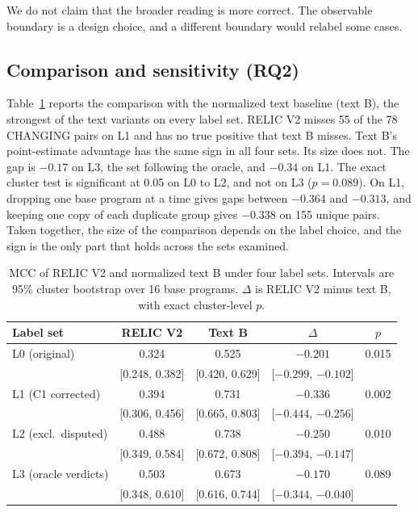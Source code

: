 \documentclass[conference]{IEEEtran}
\begin{document}
We do not claim that the broader reading is more correct. The observable boundary is a design choice, and a different boundary would relabel some cases.

\subsection{Comparison and sensitivity (RQ2)}
Table~\ref{tab:compare} reports the comparison with the normalized text baseline (text B), the strongest of the text variants on every label set. RELIC V2 misses 55 of the 78 CHANGING pairs on L1 and has no true positive that text B misses. Text B's point-estimate advantage has the same sign in all four sets. Its size does not. The gap is $-0.17$ on L3, the set following the oracle, and $-0.34$ on L1. The exact cluster test is significant at 0.05 on L0 to L2, and not on L3 ($p=0.089$). On L1, dropping one base program at a time gives gaps between $-0.364$ and $-0.313$, and keeping one copy of each duplicate group gives $-0.338$ on 155 unique pairs. Taken together, the size of the comparison depends on the label choice, and the sign is the only part that holds across the sets examined.

\begin{table}[t]
\caption{MCC of RELIC V2 and normalized text B under four label sets. Intervals are 95\% cluster bootstrap over 16 base programs. $\Delta$ is RELIC V2 minus text B, with exact cluster-level $p$.}
\label{tab:compare}
\centering
\footnotesize
\setlength{\tabcolsep}{1.5pt}
\begin{tabular}{@{}lcccc@{}}
\toprule
Label set & RELIC V2 & Text B & $\Delta$ & $p$ \\
\midrule
L0 (original) & 0.324 & 0.525 & $-0.201$ & 0.015 \\
 & [0.248, 0.382] & [0.420, 0.629] & [$-0.299$, $-0.102$] & \\
\addlinespace[2pt]
L1 (C1 corrected) & 0.394 & 0.731 & $-0.336$ & 0.002 \\
 & [0.306, 0.456] & [0.665, 0.803] & [$-0.444$, $-0.256$] & \\
\addlinespace[2pt]
L2 (excl.\ disputed) & 0.488 & 0.738 & $-0.250$ & 0.010 \\
 & [0.349, 0.584] & [0.672, 0.808] & [$-0.394$, $-0.147$] & \\
\addlinespace[2pt]
L3 (oracle verdicts) & 0.503 & 0.673 & $-0.170$ & 0.089 \\
 & [0.348, 0.610] & [0.616, 0.744] & [$-0.344$, $-0.040$] & \\
\bottomrule
\end{tabular}
\end{table}
\end{document}
